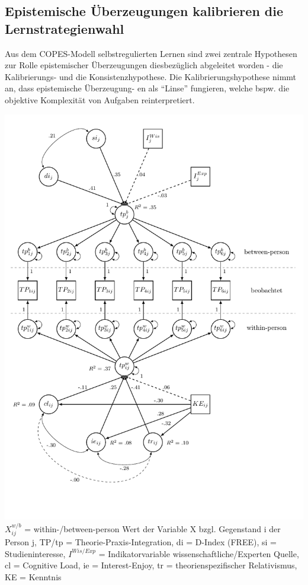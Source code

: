 \documentclass[]{tufte-handout}
\begin{document}
\subsection{Epistemische Überzeugungen kalibrieren die
Lernstrategienwahl}\label{epistemische-uberzeugungen-kalibrieren-die-lernstrategienwahl}

Aus dem COPES-Modell selbstregulierten Lernen sind zwei zentrale
Hypothesen zur Rolle epistemischer Überzeugungen diesbezüglich
abgeleitet worden - die Kalibrierungs- und die Konsistenzhypothese. Die
Kalibrierungshypothese nimmt an, dass epistemische Überzeugung- en als
``Linse'' fungieren, welche bspw. die objektive Komplexität von Aufgaben
reinterpretiert.

\begin{marginfigure}
\includegraphics{../Img/mind_the_gap_mlsem.pdf} \(X_{ij}^{w/b}\) =
within-/between-person Wert der Variable X bzgl. Gegenstand i der Person
j, TP/tp = Theorie-Praxis-Integration, di = D-Index (FREE), si =
Studieninteresse, \(I^{Wis/Exp}\) = Indikatorvariable
wissenschaftliche/Experten Quelle, cl = Cognitive Load, ie =
Interest-Enjoy, tr = theorienspezifischer Relativismus, KE = Kenntnis
\end{marginfigure}
\end{document}
